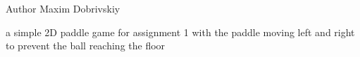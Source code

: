 \begin{DoxyAuthor}{Author}
Maxim Dobrivskiy
\end{DoxyAuthor}
a simple 2D paddle game for assignment 1 with the paddle moving left and right to prevent the ball reaching the floor 